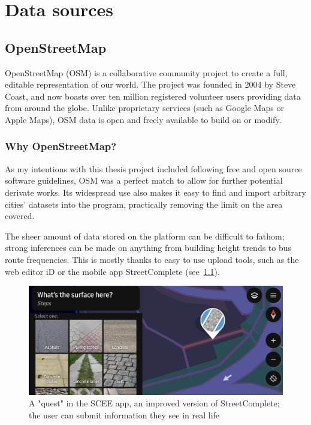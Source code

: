 \chapter{Data sources} %

\section{OpenStreetMap}

OpenStreetMap (OSM) is a collaborative community project to create a full, editable representation of our world. The project was founded in 2004 by Steve Coast, and now boasts over ten million registered volunteer users providing data from around the globe. Unlike proprietary services (such as Google Maps or Apple Maps), OSM data is open and freely available to build on or modify.\cite{osmHistory}

\subsection{Why OpenStreetMap?}

As my intentions with this thesis project included following free and open source software guidelines, OSM was a perfect match to allow for further potential derivate works. Its widespread use also makes it easy to find and import arbitrary cities' datasets into the program, practically removing the limit on the area covered.

The sheer amount of data stored on the platform can be difficult to fathom; strong inferences can be made on anything from building height trends to bus route frequencies. This is mostly thanks to easy to use upload tools, such as the web editor iD or the mobile app StreetComplete (see~\ref{scee}).

\begin{figure}[h]
    \centering
    \includegraphics[width=140mm, keepaspectratio]{images/scee_example.jpg}
    \caption{A "quest" in the SCEE app, an improved version of StreetComplete; the user can submit information they see in real life \label{scee}}
\end{figure}

